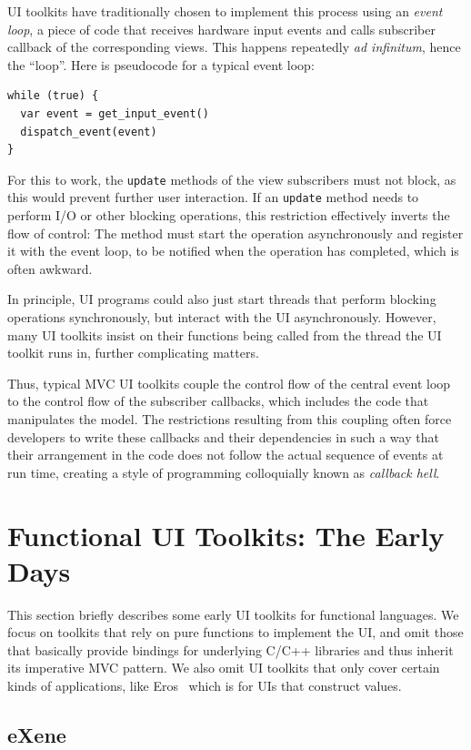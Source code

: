 \documentclass[sigplan,screen]{acmart}
\begin{document}
UI toolkits have traditionally chosen to implement this process using
an \textit{event loop}, a piece of code that receives hardware input
events and calls subscriber callback of the corresponding
views.  This happens repeatedly \textit{ad infinitum}, hence the
``loop''.  Here is pseudocode for a typical event loop:
%
\begin{verbatim}
while (true) {
  var event = get_input_event()
  dispatch_event(event)
}
\end{verbatim}
%
For this to work, the \texttt{update} methods of the view
subscribers must not block, as this would prevent further user
interaction.  If an \texttt{update} method needs to perform I/O or
other blocking operations, this restriction effectively inverts the
flow of control: The method must start the operation asynchronously
and register it with the event loop, to be notified when the operation
has completed, which is often awkward.

In principle, UI programs could also just start threads that perform
blocking operations synchronously, but interact with the UI
asynchronously.  However, many UI toolkits insist on their functions
being called from the thread the UI toolkit runs in, further
complicating matters.

Thus, typical MVC UI toolkits couple the control flow of the
central event loop to the control flow of the subscriber callbacks,
which includes the code that manipulates the model.  The restrictions
resulting from this coupling often force developers to write these
callbacks and their dependencies in such a way that their arrangement
in the code does not follow the actual sequence of events at run time,
creating a style of programming colloquially known as \textit{callback
  hell}.

\section{Functional UI Toolkits: The Early Days}
\label{sec:functional-ui}

This section briefly describes some early UI toolkits for functional
languages.  We focus on toolkits that rely on pure functions to implement
the UI, and omit those that basically provide bindings for
underlying C/C++ libraries and thus
inherit its imperative MVC pattern.  We also omit UI toolkits that
only cover certain kinds of applications, like Eros~\cite{Eros} which is
for UIs that construct values.

\subsection{eXene}
\end{document}
